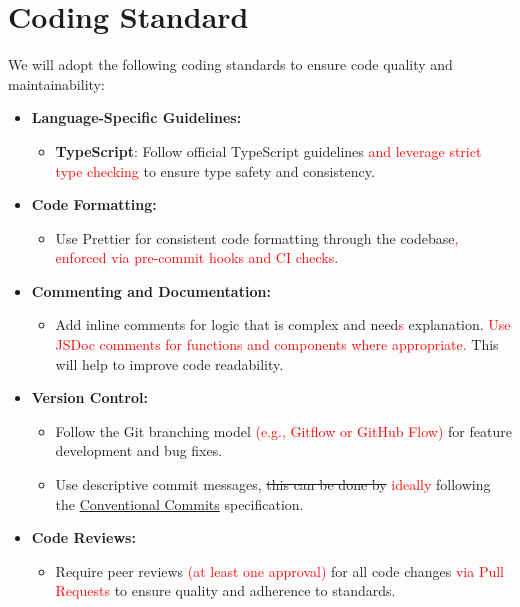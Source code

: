 \documentclass{article}
\begin{document}
\section{Coding Standard}

We will adopt the following coding standards to ensure code quality and maintainability:

\begin{itemize}
    \item \textbf{Language-Specific Guidelines:}
    \begin{itemize}
        \item \textbf{TypeScript}: Follow official TypeScript guidelines \textcolor{red}{and leverage strict type checking} to ensure type safety and consistency.
    \end{itemize}

    \item \textbf{Code Formatting:}
    \begin{itemize}
        \item Use Prettier for consistent code formatting through the codebase\textcolor{red}{, enforced via pre-commit hooks and CI checks}.
    \end{itemize}

    \item \textbf{Commenting and Documentation:}
    \begin{itemize}
        \item Add inline comments for logic that is complex and need\textcolor{red}{s} explanation. \textcolor{red}{Use JSDoc comments for functions and components where appropriate.} This will help to improve code readability.
    \end{itemize}

    \item \textbf{Version Control:}
    \begin{itemize}
        \item Follow the Git branching model \textcolor{red}{(e.g., Gitflow or GitHub Flow)} for feature development and bug fixes.
        \item Use descriptive commit messages, \sout{this can be done by} \textcolor{red}{ideally} following the \href{https://www.conventionalcommits.org/en/v1.0.0/}{Conventional Commits} specification.
    \end{itemize}

    \item \textbf{Code Reviews:}
    \begin{itemize}
        \item Require peer reviews \textcolor{red}{(at least one approval)} for all code changes \textcolor{red}{via Pull Requests} to ensure quality and adherence to standards.
    \end{itemize}


\end{itemize}
\end{document}
